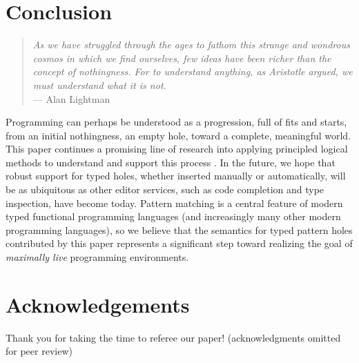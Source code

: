 \section{Conclusion}
\begin{quote}
    \emph{As we have struggled through the ages to fathom this strange and wondrous cosmos in which we find ourselves, few ideas have been richer than the concept of nothingness. For to understand anything, as Aristotle argued, we must understand what it is not.}
    \\\null\hfill --- Alan Lightman
\end{quote}

\noindent
Programming can perhaps be understood as a progression, full of fits and starts, from an initial nothingness, an empty hole, toward a complete, meaningful world. This paper continues a promising line of research into applying principled logical methods to understand and support this process \cite{DBLP:conf/popl/OmarVHAH17,HazelnutSNAPL}. In the future, we hope that robust support for typed holes, whether inserted manually or automatically, will be as ubiquitous as other editor services, such as code completion and type inspection, have become today. 
Pattern matching is a central feature of modern typed functional programming languages (and increasingly many other modern 
programming languages), so we believe that the semantics for typed pattern holes contributed by this paper represents a significant step toward realizing the goal of \emph{maximally live} programming environments.

\section*{Acknowledgements}
Thank you for taking the time to referee our paper! (acknowledgments 
omitted for peer review)


